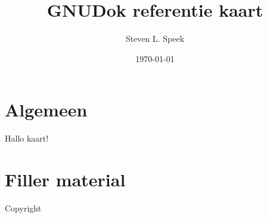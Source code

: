 \documentclass[10pt]{article}
\title{GNUDok referentie kaart}
\author{Steven L. Speek}
\date{\today{}}
\renewcommand{\maketitle}{%
{\begin{center}\Large \mythetitle\end{center}}
}
\begin{document}
\begin{multicols}{3}
	\maketitle

	\section{Algemeen}
	Hallo kaart!

	\section{Filler material}

	\lipsum

	\noindent Copyright \textcopyright{} \thedate{} \theauthor{}

\end{multicols}
\end{document}
